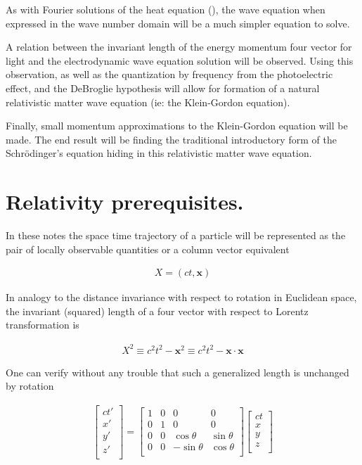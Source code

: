 \documentclass[]{eliblog}
\newcommand{\Bx}[0]{\mathbf{x}}
\newcommand{\Schrodinger}[0]{Schr\"{o}dinger}
\begin{document}
As with Fourier solutions of the heat equation (\cite{osgoodFourier}), the wave equation when expressed in the wave number domain will be a much simpler equation to solve. 

A relation between the invariant length of the energy momentum four vector for light and the electrodynamic wave equation solution will be observed.  Using this observation, as well as the quantization by frequency from the photoelectric effect, and the DeBroglie hypothesis will allow for formation of a natural relativistic matter wave equation (ie: the Klein-Gordon equation).

Finally, small momentum approximations to the Klein-Gordon equation will be made.  The end result will be finding the traditional introductory form of the \Schrodinger's equation hiding in this relativistic matter wave equation.

\section{Relativity prerequisites.}

In these notes the space time trajectory of a particle will be represented as the pair of locally observable quantities or a column vector equivalent

\begin{align}
X = (ct, \Bx)
\end{align}

In analogy to the distance invariance with respect to rotation in Euclidean space, the 
invariant (squared) length of a four vector with respect to Lorentz transformation is

\begin{align}
X^2 \equiv c^2 t^2 - \Bx^2 \equiv c^2 t^2 - \Bx \cdot \Bx
\end{align}

One can verify without any trouble that such a generalized length is unchanged by rotation

\begin{align}
\begin{bmatrix}
ct' \\
x' \\
y' \\
z' \\
\end{bmatrix}
=
\begin{bmatrix}
1 & 0 & 0 & 0 \\
0 & 1 & 0 & 0 \\
0 & 0 & \cos\theta & \sin\theta \\
0 & 0 & -\sin\theta & \cos\theta \\
\end{bmatrix}
\begin{bmatrix}
ct \\
x \\
y \\
z \\
\end{bmatrix}
\end{align}
\end{document}
